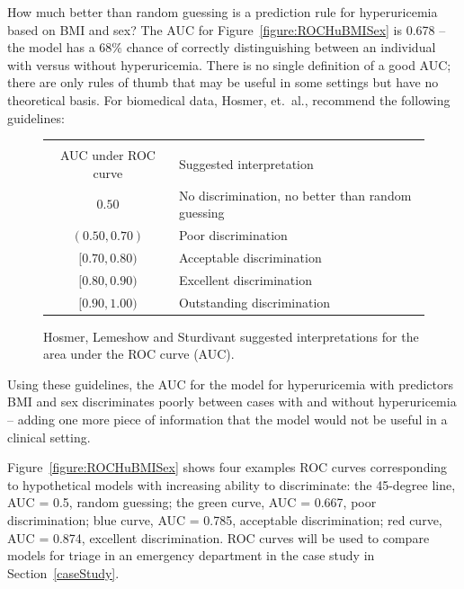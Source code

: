 How much better than random guessing is a prediction rule for hyperuricemia based on BMI and sex? The AUC for Figure~\ref{figure:ROCHuBMISex} is 0.678 -- the model has a $68\%$ chance of correctly distinguishing between an individual with versus  without hyperuricemia.  There is no single definition of a good AUC; there are only rules of thumb that may be useful in some settings but have no theoretical basis.  For biomedical data, Hosmer, et.\ al., recommend the following guidelines:
\begin{figure}[ht]
\centering
  \begin{tabular}{cl}
  \hline \\
AUC under ROC curve & Suggested interpretation  \\
  \hline
    $0.50$ & No discrimination, no better than random guessing   \\
    $(0.50, 0.70)$ & Poor discrimination \\
    $[0.70, 0.80)$ & Acceptable discrimination   \\
    $[0.80, 0.90)$ &  Excellent discrimination  \\
    $[0.90, 1.00)$ & Outstanding discrimination   \\
   \hline
\end{tabular}
  \caption{Hosmer, Lemeshow and Sturdivant suggested interpretations for the area under the ROC curve (AUC).}
\label{figure:predVsObsTriageMort30Table}
\end{figure}
Using these guidelines, the AUC for the model for hyperuricemia with predictors BMI and sex discriminates poorly between cases with and without hyperuricemia -- adding one more piece of information that the model would not be useful in a clinical setting.

Figure~\ref{figure:ROCHuBMISex} shows four examples ROC curves corresponding to hypothetical models with increasing ability to discriminate: the 45-degree line, AUC = 0.5, random guessing; the green curve, AUC = 0.667, poor discrimination; blue curve, AUC = 0.785, acceptable discrimination; red curve, AUC = 0.874, excellent discrimination. ROC curves will be used to compare models for triage in an emergency department in the case study in Section~\ref{caseStudy}.

